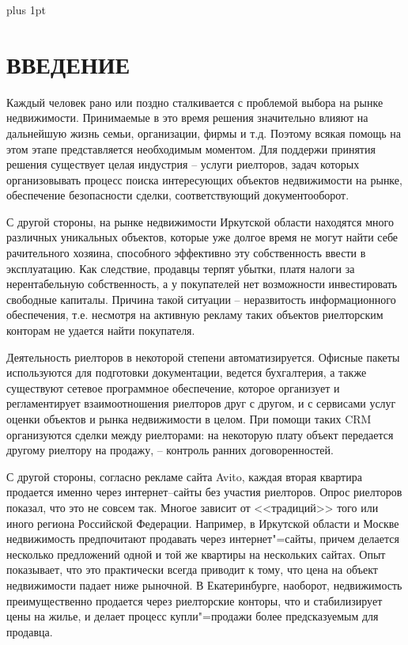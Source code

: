 \documentclass[a4paper,14pt,openany,final]{extreport} %
\date{}
\renewcommand{\chaptername}{}
\renewcommand{\bibname}{Список использованных источников}
\begin{document}
\renewcommand{\bibname}{СПИСОК ИСПОЛЬЗОВАННЫХ ИСТОЧНИКОВ}
\renewcommand{\chaptername}{}
\parskip=0pt plus 1pt

\renewcommand{\contentsname}{СОДЕРЖАНИЕ}
\tableofcontents

\chapter*{ВВЕДЕНИЕ}

Каждый человек рано или поздно сталкивается с проблемой выбора на рынке недвижимости.  Принимаемые в это время решения значительно влияют на дальнейшую жизнь семьи, организации, фирмы и т.д.
Поэтому всякая помощь на этом этапе представляется необходимым моментом.  Для поддержи принятия решения существует целая индустрия -- услуги риелторов, задач которых организовывать процесс поиска интересующих объектов недвижимости на рынке, обеспечение безопасности сделки, соответствующий документооборот.

С другой стороны, на рынке недвижимости Иркутской области находятся много различных уникальных объектов, которые уже долгое время не могут найти себе рачительного хозяина, способного эффективно эту собственность ввести в эксплуатацию.  Как следствие, продавцы терпят убытки, платя налоги за нерентабельную собственность, а у покупателей нет возможности инвестировать свободные капиталы.  Причина такой ситуации -- неразвитость информационного обеспечения, т.е. несмотря на активную рекламу таких объектов риелторским конторам не удается найти покупателя.

Деятельность риелторов в некоторой степени автоматизируется.  Офисные пакеты используются для подготовки документации, ведется бухгалтерия, а также существуют сетевое программное обеспечение, которое организует и регламентирует взаимоотношения риелторов друг с другом, и с сервисами услуг оценки объектов и рынка недвижимости в целом.  При помощи таких CRM организуются сделки между риелторами: на некоторую плату объект передается другому риелтору на продажу, -- контроль ранних договоренностей.

С другой стороны, согласно рекламе сайта Avito, каждая вторая квартира продается именно через интернет--сайты без участия риелторов.  Опрос риелторов показал, что это не совсем так.  Многое зависит от <<традиций>> того или иного региона Российской Федерации.  Например, в Иркутской области и Москве недвижимость предпочитают продавать через интернет"=сайты, причем делается несколько предложений одной и той же квартиры на нескольких сайтах.  Опыт показывает, что это практически всегда приводит к тому, что цена на объект недвижимости падает ниже рыночной.  В Екатеринбурге, наоборот, недвижимость преимущественно продается через риелторские конторы, что и стабилизирует цены на жилье, и делает процесс купли"=продажи более предсказуемым для продавца.
\end{document}
